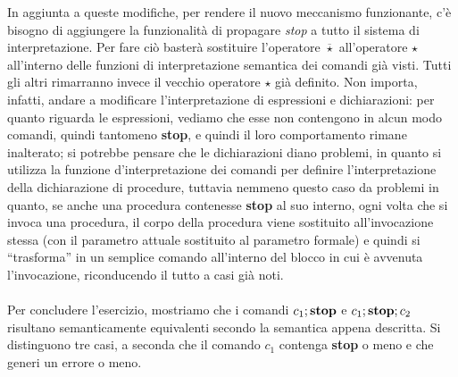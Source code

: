     In aggiunta a queste modifiche, per rendere il nuovo meccanismo funzionante, c'è bisogno di aggiungere la funzionalità di propagare \textit{stop} a tutto il sistema di interpretazione. Per fare ciò basterà sostituire l'operatore $\overline{\star}$ all'operatore $\star$ all'interno delle funzioni di interpretazione semantica dei comandi già visti. Tutti gli altri rimarranno invece il vecchio operatore $\star$ già definito. Non importa, infatti, andare a modificare l'interpretazione di espressioni e dichiarazioni: per quanto riguarda le espressioni, vediamo che esse non contengono in alcun modo comandi, quindi tantomeno \textbf{stop}, e quindi il loro comportamento rimane inalterato; si potrebbe pensare che le dichiarazioni diano problemi, in quanto si utilizza la funzione d'interpretazione dei comandi per definire l'interpretazione della dichiarazione di procedure, tuttavia nemmeno questo caso da problemi in quanto, se anche una procedura contenesse \textbf{stop} al suo interno, ogni volta che si invoca una procedura, il corpo della procedura viene sostituito all'invocazione stessa (con il parametro attuale sostituito al parametro formale) e quindi si ``trasforma'' in un semplice comando all'interno del blocco in cui è avvenuta l'invocazione, riconducendo il tutto a casi già noti.\\
    \\
    Per concludere l'esercizio, mostriamo che i comandi $c_1;\mbox{\textbf{stop}}$ e $c_1;\mbox{\textbf{stop}};c_2$ risultano semanticamente equivalenti secondo la semantica appena descritta. Si distinguono tre casi, a seconda che il comando $c_1$ contenga \textbf{stop} o meno e che generi un errore o meno.
    
